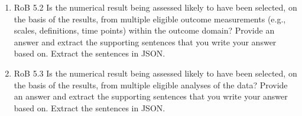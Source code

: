 \documentclass[sn-mathphys,Numbered]{sn-jnl}%
\begin{document}
\begin{enumerate}
    \item RoB 5.2 Is the numerical result being assessed likely to have been selected, on the basis of the results, from multiple eligible outcome measurements (e.g., scales, definitions, time points) within the outcome domain?  Provide an answer and extract the supporting sentences that you write your answer based on. Extract the sentences in JSON.
    \item RoB 5.3 Is the numerical result being assessed likely to have been selected, on the basis of the results, from multiple eligible analyses of the data?  Provide an answer and extract the supporting sentences that you write your answer based on. Extract the sentences in JSON.
\end{enumerate}


%
%
%
%
\end{document}
